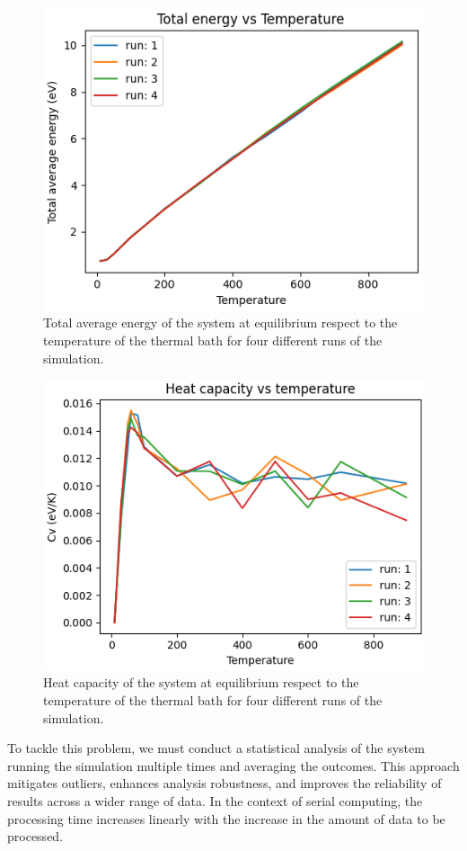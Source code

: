 \documentclass[%
 reprint,
 amsmath,amssymb,
 aps,
]{revtex4-2}
\begin{document}
\begin{figure}[!h]
    \centering
    \includegraphics[width = 0.7\linewidth]{m4E.png}
    \caption{ Total average energy of the system at equilibrium respect to the temperature of the thermal bath for four different runs of the simulation.}
    \label{fig:m4}
\end{figure}

\begin{figure}[!h]
    \centering
    \includegraphics[width = 0.7\linewidth]{m4.png}
    \caption{Heat capacity of the system at equilibrium respect to the temperature of the thermal bath for four different runs of the simulation.}
    \label{fig:serialm4}
\end{figure}

To tackle this problem, we must conduct a statistical analysis of the system running the simulation multiple times and averaging the outcomes. This approach mitigates outliers, enhances analysis robustness, and improves the reliability of results across a wider range of data. In the context of serial computing, the processing time increases linearly with the increase in the amount of data to be processed.
\end{document}
